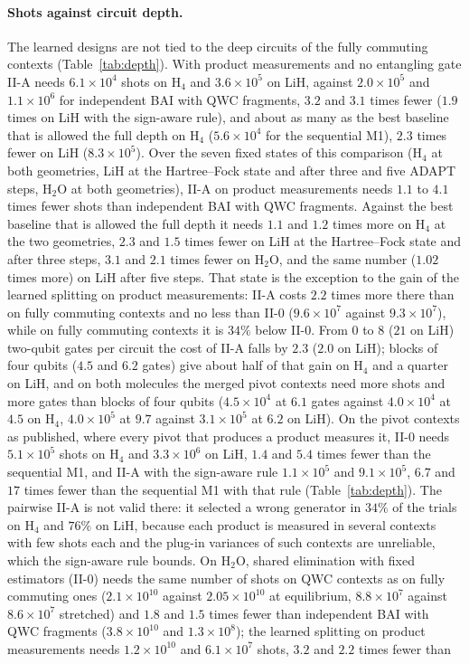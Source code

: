 \documentclass[aps,pra,reprint,superscriptaddress,nofootinbib]{revtex4-2}
\begin{document}
\paragraph{Shots against circuit depth.} The learned designs are not tied to the deep circuits of the fully commuting contexts (Table~\ref{tab:depth}). With product measurements and no entangling gate II-A needs $6.1\times10^{4}$ shots on H$_4$ and $3.6\times10^{5}$ on LiH, against $2.0\times10^{5}$ and $1.1\times10^{6}$ for independent BAI with QWC fragments, $3.2$ and $3.1$ times fewer ($1.9$ times on LiH with the sign-aware rule), and about as many as the best baseline that is allowed the full depth on H$_4$ ($5.6\times10^{4}$ for the sequential M1), $2.3$ times fewer on LiH ($8.3\times10^{5}$). Over the seven fixed states of this comparison (H$_4$ at both geometries, LiH at the Hartree--Fock state and after three and five ADAPT steps, H$_2$O at both geometries), II-A on product measurements needs $1.1$ to $4.1$ times fewer shots than independent BAI with QWC fragments. Against the best baseline that is allowed the full depth it needs $1.1$ and $1.2$ times more on H$_4$ at the two geometries, $2.3$ and $1.5$ times fewer on LiH at the Hartree--Fock state and after three steps, $3.1$ and $2.1$ times fewer on H$_2$O, and the same number ($1.02$ times more) on LiH after five steps. That state is the exception to the gain of the learned splitting on product measurements: II-A costs $2.2$ times more there than on fully commuting contexts and no less than II-0 ($9.6\times10^{7}$ against $9.3\times10^{7}$), while on fully commuting contexts it is $34\%$ below II-0. From $0$ to $8$ ($21$ on LiH) two-qubit gates per circuit the cost of II-A falls by $2.3$ ($2.0$ on LiH); blocks of four qubits ($4.5$ and $6.2$ gates) give about half of that gain on H$_4$ and a quarter on LiH, and on both molecules the merged pivot contexts need more shots and more gates than blocks of four qubits ($4.5\times10^{4}$ at $6.1$ gates against $4.0\times10^{4}$ at $4.5$ on H$_4$, $4.0\times10^{5}$ at $9.7$ against $3.1\times10^{5}$ at $6.2$ on LiH). On the pivot contexts as published, where every pivot that produces a product measures it, II-0 needs $5.1\times10^{5}$ shots on H$_4$ and $3.3\times10^{6}$ on LiH, $1.4$ and $5.4$ times fewer than the sequential M1, and II-A with the sign-aware rule $1.1\times10^{5}$ and $9.1\times10^{5}$, $6.7$ and $17$ times fewer than the sequential M1 with that rule (Table~\ref{tab:depth}). The pairwise II-A is not valid there: it selected a wrong generator in $34\%$ of the trials on H$_4$ and $76\%$ on LiH, because each product is measured in several contexts with few shots each and the plug-in variances of such contexts are unreliable, which the sign-aware rule bounds. On H$_2$O, shared elimination with fixed estimators (II-0) needs the same number of shots on QWC contexts as on fully commuting ones ($2.1\times10^{10}$ against $2.05\times10^{10}$ at equilibrium, $8.8\times10^{7}$ against $8.6\times10^{7}$ stretched) and $1.8$ and $1.5$ times fewer than independent BAI with QWC fragments ($3.8\times10^{10}$ and $1.3\times10^{8}$); the learned splitting on product measurements needs $1.2\times10^{10}$ and $6.1\times10^{7}$ shots, $3.2$ and $2.2$ times fewer than 
\end{document}
